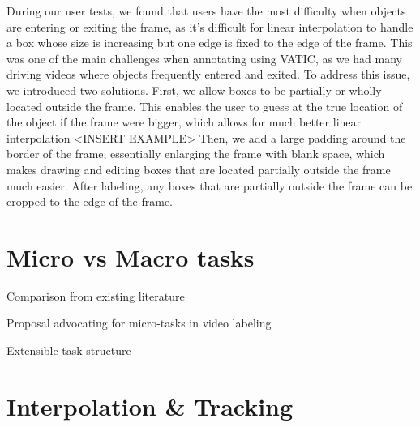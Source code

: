 During our user tests, we found that users have the most difficulty when objects are entering or exiting the frame, as it's difficult for linear interpolation to handle a box whose size is increasing but one edge is fixed to the edge of the frame. 
This was one of the main challenges when annotating using VATIC, as we had many driving videos where objects frequently entered and exited.
To address this issue, we introduced two solutions.
First, we allow boxes to be partially or wholly located outside the frame. 
This enables the user to guess at the true location of the object if the frame were bigger, which allows for much better linear interpolation <INSERT EXAMPLE>
Then, we add a large padding around the border of the frame, essentially enlarging the frame with blank space, which makes drawing and editing boxes that are located partially outside the frame much easier. 
After labeling, any boxes that are partially outside the frame can be cropped to the edge of the frame.

\section{Micro vs Macro tasks}

Comparison from existing literature

Proposal advocating for micro-tasks in video labeling

Extensible task structure

\section{Interpolation \& Tracking}
